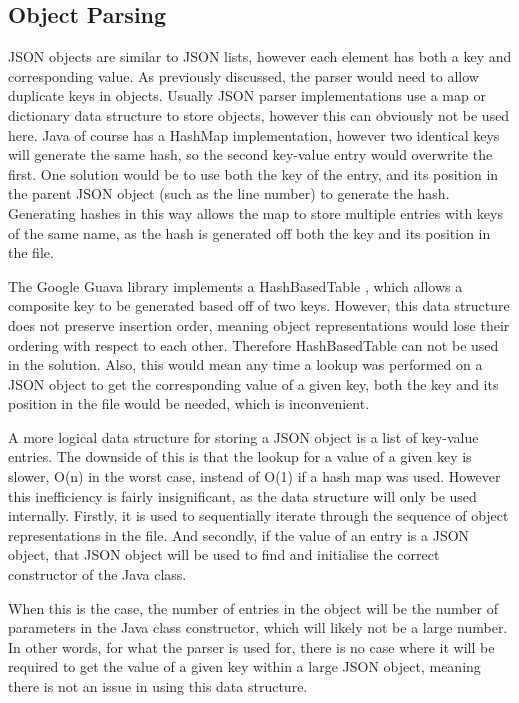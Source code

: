 \subsection{Object Parsing}
JSON objects are similar to JSON lists, however each element has both a key and corresponding value. As previously discussed, the parser would need to allow duplicate keys in objects. Usually JSON parser implementations use a map or dictionary data structure to store objects, however this can obviously not be used here. Java of course has a HashMap implementation, however two identical keys will generate the same hash, so the second key-value entry would overwrite the first. One solution would be to use both the key of the entry, and its position in the parent JSON object (such as the line number) to generate the hash. Generating hashes in this way allows the map to store multiple entries with keys of the same name, as the hash is generated off both the key and its position in the file.\par
The Google Guava library implements a HashBasedTable \cite{hash_based_table}, which allows a composite key to be generated based off of two keys. However, this data structure does not preserve insertion order, meaning object representations would lose their ordering with respect to each other. Therefore HashBasedTable can not be used in the solution. Also, this would mean any time a lookup was performed on a JSON object to get the corresponding value of a given key, both the key and its position in the file would be needed, which is inconvenient.\par
A more logical data structure for storing a JSON object is a list of key-value entries. The downside of this is that the lookup for a value of a given key is slower, O(n) in the worst case, instead of O(1) if a hash map was used. However this inefficiency is fairly insignificant, as the data structure will only be used internally. Firstly, it is used to sequentially iterate through the sequence of object representations in the file. And secondly, if the value of an entry is a JSON object, that JSON object will be used to find and initialise the correct constructor of the Java class.\par
When this is the case, the number of entries in the object will be the number of parameters in the Java class constructor, which will likely not be a large number. In other words, for what the parser is used for, there is no case where it will be required to get the value of a given key within a large JSON object, meaning there is not an issue in using this data structure.\par
